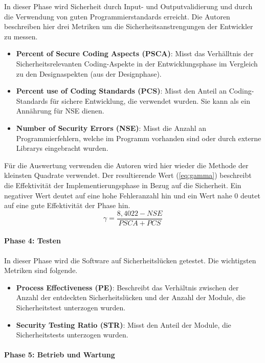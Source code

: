 \documentclass[12pt, a4paper, ngerman]{article}
\begin{document}
In dieser Phase wird Sicherheit durch Input- und Outputvalidierung und durch die Verwendung von guten Programmierstandards erreicht.
Die Autoren beschreiben hier drei Metriken um die Sicherheitsanstrengungen der Entwickler zu messen.
\begin{itemize}
  \item \textbf{Percent of Secure Coding Aspects (PSCA)}: Misst das Verhälltnis der Sicherheitsrelevanten Coding-Aspekte in der Entwicklungsphase im Vergleich zu den Designaspekten (aus der Designphase).
  \item \textbf{Percent use of Coding Standards (PCS)}: Misst den Anteil an Coding-Standards für sichere Entwicklung, die verwendet wurden. Sie kann als ein Annährung für NSE dienen.
  \item \textbf{Number of Security Errors (NSE)}: Misst die Anzahl an Programmierfehlern, welche im Programm vorhanden sind oder durch externe Librarys eingebracht wurden.
\end{itemize}
Für die Auswertung verwenden die Autoren wird hier wieder die Methode der kleinsten Quadrate verwendet.
Der resultierende Wert \gamma (\ref{eq:gamma}) beschreibt die Effektivität der Implementierungsphase in Bezug auf die Sicherheit.
Ein negativer \gamma Wert deutet auf eine hohe Fehleranzahl hin und ein Wert nahe 0 deutet auf eine gute Effektivität der Phase hin.
\begin{equation} \label{eq:gamma}
  \gamma = \frac{ 8,4022 - NSE }{ PSCA + PCS }
\end{equation}

\paragraph{Phase 4: Testen}

In dieser Phase wird die Software auf Sicherheitslücken getestet.
Die wichtigsten Metriken sind folgende.
\begin{itemize}
  \item \textbf{Process Effectiveness (PE)}: Beschreibt das Verhältnis zwischen der Anzahl der entdeckten Sicherheitslücken und der Anzahl der Module, die Sicherheitstest unterzogen wurden.
  \item \textbf{Security Testing Ratio (STR)}: Misst den Anteil der Module, die Sicherheitstests unterzogen wurden.
\end{itemize}

\paragraph{Phase 5: Betrieb und Wartung}
\end{document}
